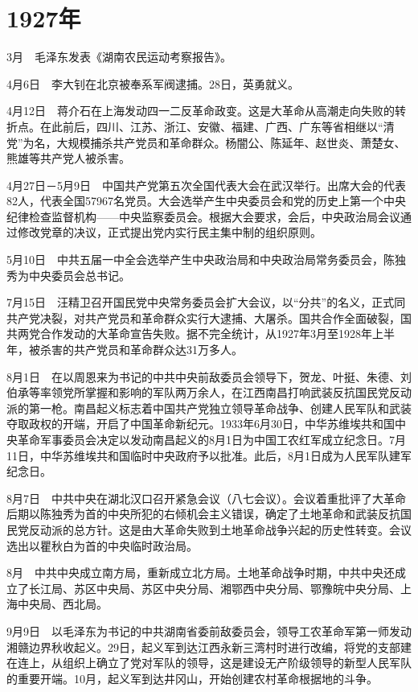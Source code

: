 \documentclass[10pt,a4paper,twocolumn]{book}
\begin{document}
\section{1927年}

3月　毛泽东发表《湖南农民运动考察报告》。

4月6日　李大钊在北京被奉系军阀逮捕。28日，英勇就义。

4月12日　蒋介石在上海发动四一二反革命政变。这是大革命从高潮走向失败的转折点。在此前后，四川、江苏、浙江、安徽、福建、广西、广东等省相继以“清党”为名，大规模捕杀共产党员和革命群众。杨闇公、陈延年、赵世炎、萧楚女、熊雄等共产党人被杀害。

4月27日－5月9日　中国共产党第五次全国代表大会在武汉举行。出席大会的代表82人，代表全国57967名党员。大会选举产生中央委员会和党的历史上第一个中央纪律检查监督机构——中央监察委员会。根据大会要求，会后，中央政治局会议通过修改党章的决议，正式提出党内实行民主集中制的组织原则。

5月10日　中共五届一中全会选举产生中央政治局和中央政治局常务委员会，陈独秀为中央委员会总书记。

7月15日　汪精卫召开国民党中央常务委员会扩大会议，以“分共”的名义，正式同共产党决裂，对共产党员和革命群众实行大逮捕、大屠杀。国共合作全面破裂，国共两党合作发动的大革命宣告失败。据不完全统计，从1927年3月至1928年上半年，被杀害的共产党员和革命群众达31万多人。

8月1日　在以周恩来为书记的中共中央前敌委员会领导下，贺龙、叶挺、朱德、刘伯承等率领党所掌握和影响的军队两万余人，在江西南昌打响武装反抗国民党反动派的第一枪。南昌起义标志着中国共产党独立领导革命战争、创建人民军队和武装夺取政权的开端，开启了中国革命新纪元。1933年6月30日，中华苏维埃共和国中央革命军事委员会决定以发动南昌起义的8月1日为中国工农红军成立纪念日。7月11日，中华苏维埃共和国临时中央政府予以批准。此后，8月1日成为人民军队建军纪念日。

8月7日　中共中央在湖北汉口召开紧急会议（八七会议）。会议着重批评了大革命后期以陈独秀为首的中央所犯的右倾机会主义错误，确定了土地革命和武装反抗国民党反动派的总方针。这是由大革命失败到土地革命战争兴起的历史性转变。会议选出以瞿秋白为首的中央临时政治局。

8月　中共中央成立南方局，重新成立北方局。土地革命战争时期，中共中央还成立了长江局、苏区中央局、苏区中央分局、湘鄂西中央分局、鄂豫皖中央分局、上海中央局、西北局。

9月9日　以毛泽东为书记的中共湖南省委前敌委员会，领导工农革命军第一师发动湘赣边界秋收起义。29日，起义军到达江西永新三湾村时进行改编，将党的支部建在连上，从组织上确立了党对军队的领导，这是建设无产阶级领导的新型人民军队的重要开端。10月，起义军到达井冈山，开始创建农村革命根据地的斗争。
\end{document}
